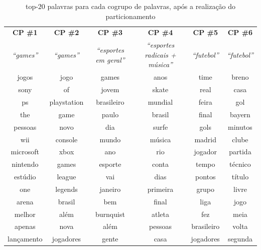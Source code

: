 \documentclass[
    12pt,                %
    oneside,            %
    a4paper,            %
    english,            %
    brazil                %
    ]{abntex2ppgsi}
\begin{document}
\begin{table}
    \begin{table}[H]
    \centering
        \caption{top-$20$ palavras para cada cogrupo de palavras, após a realização do particionamento}
        \begin{tabular}{cccccc}
            \hline
            \textbf{CP \#1} & \textbf{CP \#2} & \textbf{CP \#3} & \textbf{CP \#4} & \textbf{CP \#5} & \textbf{CP \#6} \\
            \textit{``games''} & \textit{``games''} & \textit{``esportes em geral''} & \textit{``esportes radicais + música''} & \textit{``futebol''} & \textit{``futebol''} \\
            \hline
            jogos      & jogo               & games      & anos              & time       & breno  \\
            sony       & of                 & jovem      & skate             & real       & casa  \\
            ps         & playstation        & brasileiro & mundial           & feira      & gol  \\
            the        & game               & paulo      & brasil            & final      & bayern  \\
            pessoas    & novo               & dia        & surfe             & gols       & minutos  \\
            wii        & console            & mundo      & música            & madrid     & clube  \\
            microsoft  & xbox               & ano        & rio               & jogador    & partida  \\
            nintendo   & games              & esporte    & conta             & tempo      & técnico  \\
            estúdio    & league             & vai        & dias              & pontos     & título  \\
            one        & legends            & janeiro    & primeira          & grupo      & livre  \\
            arena      & brasil             & bem        & final             & liga       & jogo  \\
            melhor     & além               & burnquist  & atleta            & fez        & meia  \\
            apenas     & nova               & além       & pessoas           & brasileiro & volta  \\
            lançamento & jogadores          & gente      & casa              & jogadores  & segunda  \\

\end{tabular}
\end{table}
\end{table}
\end{document}
